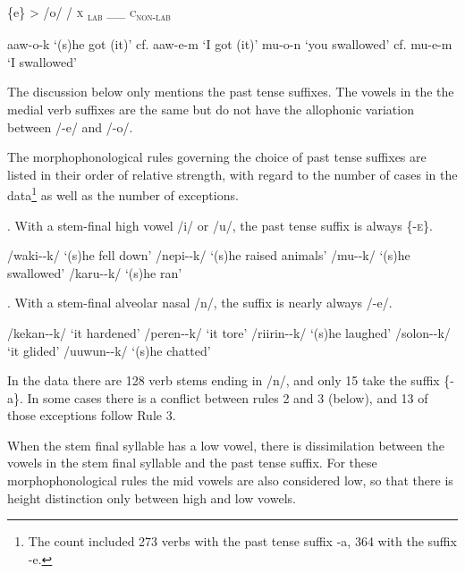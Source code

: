 \ea
\{e\} {{\textgreater}} /o/  /  \textsc{x} \textsubscript{\textsc{lab}}  \_\_  \textsc{c}\textsubscript{\textsc{non-lab}} 
\z

\ea
\ea
aaw-o-k  `(s)he got (it)'  cf.  aaw-e-m  `I got (it)'
\ex
mu-o-n  `you swallowed'  cf.  mu-e-m  `I swallowed'
\z
\z

The discussion below only mentions the past tense suffixes. The vowels in the  the medial verb suffixes are the same but do not have the allophonic variation between /-e/ and /-o/.  

The morphophonological rules governing the choice of past tense suffixes are listed in their order of relative strength, with regard to the number of cases in the data\footnote{The count included 273 verbs with the past tense suffix  -a,  364 with the suffix -e.} as well as the number of exceptions.

\ea
{}.  With a stem-final high vowel /i/ or /u/, the past tense suffix is always \{\nobreakdash-\textsc{e}\}.
\z


\ea
\ea
/waki--k/  `(s)he fell down'
\ex
/nepi--k/  `(s)he raised animals'
\ex
/mu--k/  `(s)he swallowed'
\ex
/karu--k/  `(s)he ran'
\z
\z

\ea
{}.  With a stem-final alveolar nasal /n/, the suffix is nearly always /-e/.
\z

\ea
\ea
/kekan--k/  `it hardened'
\ex
/peren--k/  `it tore'
\ex
/riirin--k/  `(s)he laughed'
\ex
/solon--k/  `it glided'
\ex
/uuwun--k/  `(s)he chatted'
\z
\z

In the data there are 128 verb stems ending in /n/, and only 15 take the suffix \{\nobreakdash-a\}. In some cases there is a conflict between rules 2 and 3 (below), and 13 of those exceptions follow Rule 3.

\ea
{} When the stem final syllable has a low vowel, there is dissimilation between the vowels in the stem final syllable and the past tense suffix. For these morphophonological rules the mid vowels are also considered low, so that there is height distinction only between high and low vowels.
\z

